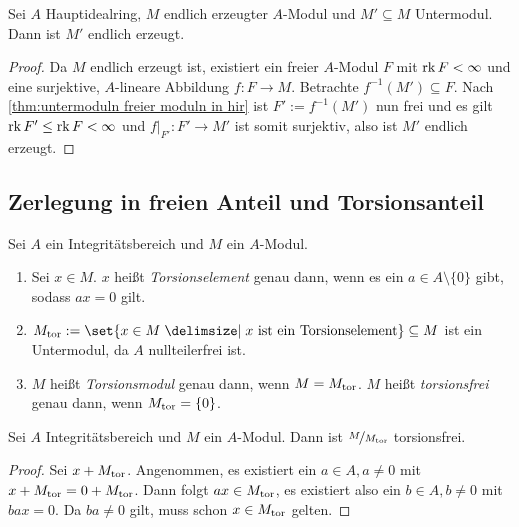 \documentclass[12pt,a4paper]{scrartcl}
\theoremstyle{cplain}
\theoremstyle{cdef}
\begin{document}
\begin{kor}
	Sei $A$ Hauptidealring, $M$ endlich erzeugter $A$-Modul und $M'\subseteq M$ Untermodul. Dann ist $M'$ endlich erzeugt.
\end{kor}
\begin{proof}
	Da $M$ endlich erzeugt ist, existiert ein freier $A$-Modul $F$ mit $\operatorname{rk} F<\infty$ und eine surjektive, $A$-lineare Abbildung $f\colon F\to M$. Betrachte $f^{-1}(M')\subseteq F$. Nach \cref{thm:untermoduln freier moduln in hir} ist $F' := f^{-1}(M')$ nun frei und es gilt $\operatorname{rk} F'\le \operatorname{rk} F <\infty$ und $f|_{F'}\colon F'\to M'$ ist somit surjektiv, also ist $M'$ endlich erzeugt.
\end{proof}


\subsection{Zerlegung in freien Anteil und Torsionsanteil}
\begin{defi}
	Sei $A$ ein Integritätsbereich und $M$ ein $A$-Modul.
	\begin{enumerate}
		\item Sei $x\in M$. $x$ heißt \emph{Torsionselement} genau dann, wenn es ein $a\in A\setminus\{0\}$ gibt, sodass $ax = 0$ gilt.
		\item $M_{\tor} := \set{x\in M \given x \text{ ist ein Torsionselement}}\subseteq M$ ist ein Untermodul, da $A$ nullteilerfrei ist.
		\item $M$ heißt \emph{Torsionsmodul }genau dann, wenn $M = M_{\operatorname{tor}}$.
			  $M$ heißt \emph{torsionsfrei} genau dann, wenn $M_{\operatorname{tor}} = \{0\}$.
	\end{enumerate}
	
\end{defi}

\begin{lem} \label{lem:torsionsquotient torsionsfrei}
	Sei $A$ Integritätsbereich und $M$ ein $A$-Modul. Dann ist $\nicefrac{M}{M_{\operatorname{tor}}}$ torsionsfrei.
\end{lem}
\begin{proof}
	Sei $x+M_{\operatorname{tor}}$. Angenommen, es existiert ein $a\in A, a\neq 0$ mit $x+M_{\operatorname{tor}} = 0+M_{\operatorname{tor}}$. Dann folgt $ax\in M_{\operatorname{tor}}$, es existiert also ein $b\in A, b\neq 0$ mit $bax = 0$. Da $ba\neq 0$ gilt, muss schon $x\in M_{\operatorname{tor}}$ gelten.
\end{proof}
\end{document}
